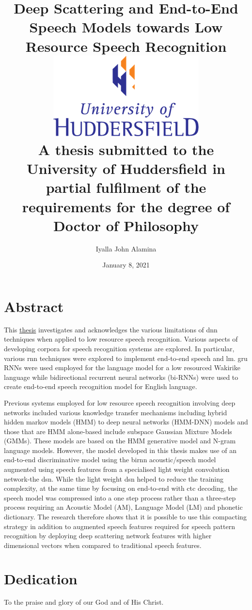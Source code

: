 \documentclass[12pt,twoside]{report}
\title{
    {Deep Scattering and End-to-End Speech Models towards Low Resource Speech Recognition}\\
    {\includegraphics{university.png}\\
A thesis submitted to the University of Huddersfield in partial fulfilment of the requirements for the degree of Doctor of Philosophy}
}
\author{Iyalla John Alamina}
\date{January 8, 2021}
\begin{document}
\makeglossaries


\maketitle
{}

\chapter*{Abstract}
This \href{https://docs.google.com/document/d/1jBp2bZf_-yWbqpSeeyGhU8uZ94o-oiHh6g_cRtjaWFQ/edit#heading=h.34qugrunyk2x}{thesis} investigates and acknowledges the various limitations of \acrfull{dnn} techniques when applied to low resource speech recognition.   Various aspects of developing corpora for speech recognition systems are explored.  In particular, various \acrfull{rnn} techniques were explored to implement end-to-end speech and \acrfull{lm}. \acrfull{gru} RNNs were used employed for the language model for a low resourced Wakirike language while bidirectional recurrent neural networks (bi-RNNs) were used to create end-to-end speech recognition model for English language.

Previous systems employed for low resource speech recognition involving deep networks included various knowledge transfer mechanisms including hybrid hidden markov models (HMM) to deep neural networks (HMM-DNN) models and those that are HMM alone-based include subspace Gaussian Mixture Models (GMMs).   These models are based on the HMM generative model and N-gram language models.  However, the model developed in this thesis makes use of an end-to-end discriminative model using the \acrshort{birnn} acoustic/speech model augmented using speech features from a specialised light weight convolution network-the \acrfull{dsn}.  While the light weight \acrshort{dsn} helped to reduce the training complexity, at the same time by focusing on end-to-end with \acrfull{ctc} decoding, the speech model was compressed into a one step process rather than a three-step process requiring an Acoustic Model (AM), Language Model (LM) and phonetic dictionary. The research therefore shows that it is possible to use this compacting strategy in addition to augmented speech features required for speech pattern recognition by deploying deep scattering network features with  higher dimensional vectors when compared to traditional speech features. 

\chapter*{Dedication}
To the praise and glory of our God and of His Christ.
\end{document}
